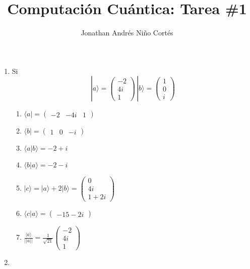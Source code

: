 \documentclass[letter,twoside,12pt]{article}
\title{Computación Cuántica: Tarea \#1}
\author{Jonathan Andrés Niño Cortés}
\begin{document}
\maketitle
\begin{enumerate}
\item Si
\begin{equation}
|a \rangle = 
\begin{pmatrix}
-2
\\ 4i
\\ 1
\end{pmatrix} \,
|b \rangle = 
\begin{pmatrix}
1
\\ 0
\\ i
\end{pmatrix} \nonumber
\end{equation}
\begin{enumerate}
\item $ \langle a | = \begin{pmatrix}
-2 & -4i & 1
\end{pmatrix} $

\item $ \langle b | = \begin{pmatrix}
1 & 0 & -i
\end{pmatrix} $

\item $ \langle a | b \rangle = -2+ i$

\item $ \langle b | a \rangle = -2 -i $

\item $ | c \rangle = | a \rangle +2| b \rangle = \begin{pmatrix}
0 
\\ 4i 
\\ 1+2i
\end{pmatrix} $

\item $ \langle c | a \rangle = \begin{pmatrix}
-15-2i
\end{pmatrix} $

\item $ \frac{| a \rangle}{||a||} = \frac{1}{\sqrt{21}}\begin{pmatrix}
-2 
\\ 4i 
\\ 1
\end{pmatrix}  $
\end{enumerate}
\item 


\end{enumerate}
\end{document}
